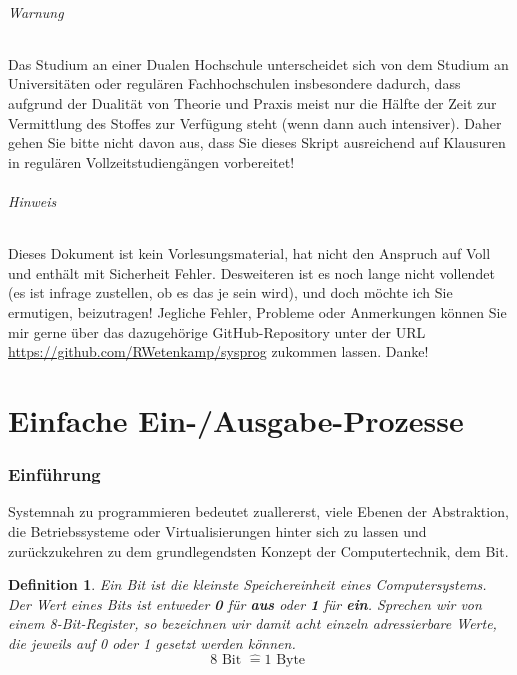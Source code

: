 \documentclass[11pt,a4paper]{scrartcl}
\newtheorem{definition}{Definition}
\begin{document}
\paragraph{Warnung}
Das Studium an einer Dualen Hochschule unterscheidet sich von dem Studium an Universitäten oder regulären Fachhochschulen insbesondere dadurch, dass aufgrund der Dualität von Theorie und Praxis meist nur die Hälfte der Zeit zur Vermittlung des Stoffes zur Verfügung steht (wenn dann auch intensiver). Daher gehen Sie bitte nicht davon aus, dass Sie dieses Skript ausreichend auf Klausuren in regulären Vollzeitstudiengängen vorbereitet!
\paragraph{Hinweis}
Dieses Dokument ist kein Vorlesungsmaterial, hat nicht den Anspruch auf {Voll} und enthält mit Sicherheit Fehler. Desweiteren ist es noch lange nicht vollendet (es ist infrage zustellen, ob es das je sein wird), und doch möchte ich Sie ermutigen, beizutragen! Jegliche Fehler, Probleme oder Anmerkungen können Sie mir gerne über das dazugehörige GitHub-Repository unter der URL \url{https://github.com/RWetenkamp/sysprog} zukommen lassen. Danke!
\pagebreak
\part{Einfache Ein-/Ausgabe-Prozesse}
\section{Einführung}
Systemnah zu programmieren bedeutet zuallererst, viele Ebenen der Abstraktion, die Betriebssysteme oder Virtualisierungen hinter sich zu lassen und zurückzukehren zu dem grundlegendsten Konzept der Computertechnik, dem Bit. \\
\begin{definition}
Ein Bit ist die kleinste Speichereinheit eines Computersystems. Der Wert eines Bits ist entweder \textbf{0} für \textbf{aus} oder \textbf{1} für \textbf{ein}. Sprechen wir von einem 8-Bit-Register, so bezeichnen wir damit acht einzeln adressierbare Werte, die jeweils auf 0 oder 1 gesetzt werden können. 
\[8 \text{ Bit } \widehat{=} 1 \text{ Byte }\]
\end{definition}
\end{document}
